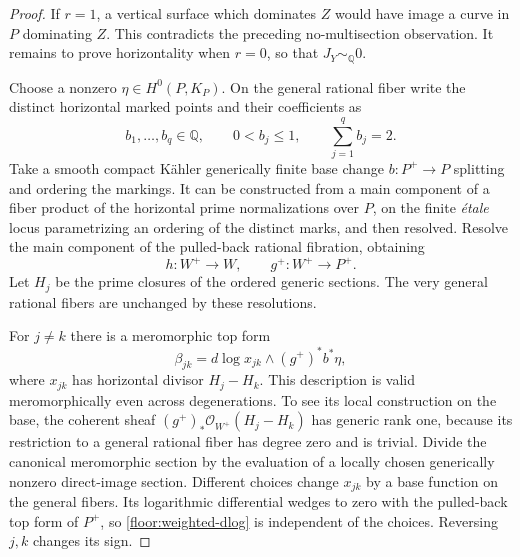 \documentclass[11pt,letterpaper]{article}
\newcommand{\Q}{\mathbb{Q}}
\newcommand{\OO}{\mathcal{O}}
\theoremstyle{definition}
\theoremstyle{remark}
\begin{document}
\begin{proof}
If $r=1$, a vertical surface which dominates $Z$ would have image
a curve in $P$ dominating $Z$.  This contradicts the preceding
no-multisection observation.  It remains to prove horizontality
when $r=0$, so that $J_Y\sim_\Q0$.

Choose a nonzero $\eta\in H^0(P,K_P)$.  On the general rational
fiber write the distinct horizontal marked points and their
coefficients as
\[
 b_1,\ldots,b_q\in\Q,\qquad
 0<b_j\le1,\qquad \sum_{j=1}^q b_j=2.
\]
Take a smooth compact K\"ahler generically finite base change
$b:P^+\to P$ splitting and ordering the markings.  It can be
constructed from a main component of a fiber product of the
horizontal prime normalizations over $P$, on the finite \emph{\'etale}
locus parametrizing an ordering of the distinct marks, and then
resolved.  Resolve the main component of the pulled-back rational
fibration, obtaining
\[
 h:W^+\longrightarrow W,\qquad
 g^+:W^+\longrightarrow P^+.
\]
Let $H_j$ be the prime closures of the ordered generic sections.
The very general rational fibers are unchanged by these resolutions.

For $j\ne k$ there is a meromorphic top form
\begin{equation}
 \label{floor:weighted-dlog}
 \beta_{jk}=d\log x_{jk}\wedge(g^+)^*b^*\eta,
\end{equation}
where $x_{jk}$ has horizontal divisor $H_j-H_k$.  This description
is valid meromorphically even across degenerations.  To see its
local construction on the base, the coherent sheaf
$(g^+)_*\OO_{W^+}(H_j-H_k)$ has generic rank one, because its
restriction to a general rational fiber has degree zero and is
trivial.  Divide the canonical meromorphic section by the
evaluation of a locally chosen generically nonzero direct-image
section.  Different choices change $x_{jk}$ by a base function on
the general fibers.  Its logarithmic differential wedges to zero
with the pulled-back top form of $P^+$, so
\eqref{floor:weighted-dlog} is independent of the choices.
Reversing $j,k$ changes its sign.


\end{proof}
\end{document}
